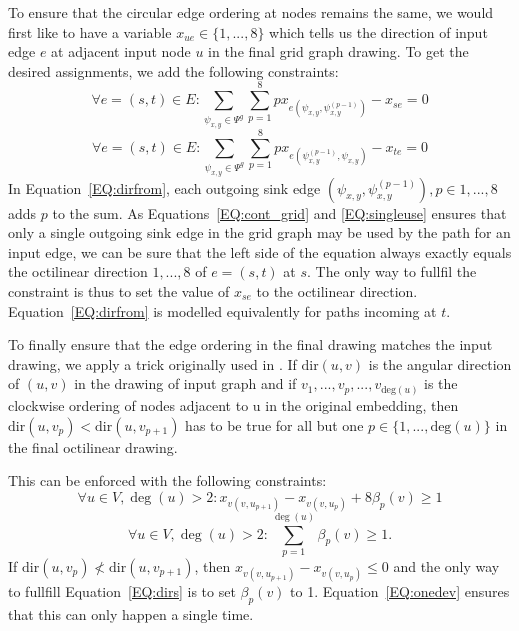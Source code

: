 \documentclass{sig-alternate-sigmod09}
\begin{document}
To ensure that the circular edge ordering at nodes remains the same, we would first like to have a variable $x_{ue} \in \{1, ..., 8\}$ which tells us the direction of input edge $e$ at adjacent input node $u$ in the final grid graph drawing.
To get the desired assignments, we add the following constraints:
%
\begin{equation}
  \forall e = (s, t) \in E: \sum_{\psi_{x, y} \in \Psi^g} \sum_{p = 1}^8 p x_{e(\psi_{x, y},  \psi_{x, y}^{(p - 1)})} - x_{se} = 0\label{EQ:dirfrom}
\end{equation}
\begin{equation}
  \forall e = (s, t) \in E: \sum_{\psi_{x, y} \in \Psi^g} \sum_{p = 1}^8 p x_{e(\psi_{x, y}^{(p - 1)}, \psi_{x, y})} - x_{te} = 0\label{EQ:dirto}
\end{equation}
%
In Equation~\ref{EQ:dirfrom}, each outgoing sink edge $(\psi_{x, y},  \psi_{x, y}^{(p - 1)}), p \in {1, ..., 8}$ adds $p$ to the sum.
As Equations~\ref{EQ:cont_grid} and \ref{EQ:singleuse} ensures that only a single outgoing sink edge in the grid graph may be used by the path for an input edge, we can be sure that the left side of the equation always exactly equals the octilinear direction $1, ..., 8$ of $e = (s, t)$ at $s$.
The only way to fullfil the constraint is thus to set the value of $x_{se}$ to the octilinear direction.
Equation~\ref{EQ:dirfrom} is modelled equivalently for paths incoming at $t$.

To finally ensure that the edge ordering in the final drawing matches the input drawing, we apply a trick originally used in \cite{noellenburg}.
If $\text{dir}(u, v)$ is the angular direction of $(u, v)$ in the drawing of input graph and if $v_1, ..., v_p, ..., v_{\text{deg}(u)}$ is the clockwise ordering of nodes adjacent to u in the original embedding, then $\text{dir}(u, v_p) < \text{dir}(u, v_{p + 1})$ has to be true for all but one $p \in \{1, ..., \text{deg}(u)\}$ in the final octilinear drawing.

This can be enforced with the following constraints:
%
\begin{equation}
  \forall u \in V, \deg(u) > 2: x_{v(v, u_{p + 1})} - x_{v(v, u_{p})} + 8\beta_p(v) \geq 1\label{EQ:dirs}
\end{equation}
\begin{equation} 
  \forall u \in V, \deg(u) > 2: \sum_{p = 1}^{\deg(u)} \beta_p(v) \geq 1\label{EQ:onedev}.
\end{equation}
%
If $\text{dir}(u, v_p) \not< \text{dir}(u, v_{p + 1})$, then $x_{v(v, u_{p + 1})} - x_{v(v, u_{p})} \leq 0$ and the only way to fullfill Equation~\ref{EQ:dirs} is to set $\beta_p(v)$ to 1.
Equation~\ref{EQ:onedev} ensures that this can only happen a single time.
\end{document}
